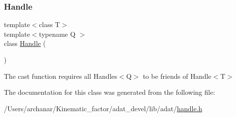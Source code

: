 \subsubsection{\texorpdfstring{Handle}{Handle}\hspace{0.1cm}{\footnotesize\ttfamily [2/2]}}
{\footnotesize\ttfamily template$<$class T$>$ \\
template$<$typename Q $>$ \\
class \mbox{\hyperlink{classADAT_1_1Handle}{Handle}} (\begin{DoxyParamCaption}{ }\end{DoxyParamCaption})\hspace{0.3cm}{\ttfamily [friend]}}



The cast function requires all Handles$<$\+Q$>$ to be friends of Handle$<$\+T$>$ 



The documentation for this class was generated from the following file\+:\begin{DoxyCompactItemize}
\item 
/\+Users/archanar/\+Kinematic\+\_\+factor/adat\+\_\+devel/lib/adat/\mbox{\hyperlink{lib_2adat_2handle_8h}{handle.\+h}}\end{DoxyCompactItemize}
